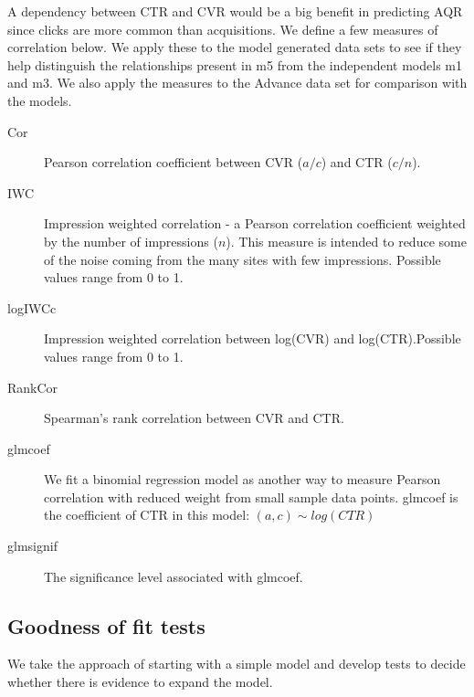 \documentclass[11pt,a4,singlespacing,titlepagenumber=on]{scrreprt}
\numberwithin{equation}{chapter} %
\theoremstyle{remark}
\begin{document}
A dependency between CTR and CVR would be a big benefit in predicting AQR since clicks are more common than acquisitions. We define a few measures of correlation below. We apply these to the model generated data sets to see if they help distinguish the relationships present in m5 from the independent models m1 and m3. We also apply the measures to the Advance data set for comparison with the models.

\begin{description}
	\item[Cor] Pearson correlation coefficient between CVR ($a/c$) and CTR ($c/n$).
	\item[IWC] Impression weighted correlation - a Pearson correlation coefficient weighted by the number of impressions ($n$). This measure is intended to reduce some of the noise coming from the many sites with few impressions. Possible values range from 0 to 1.
	\item[logIWCc] Impression weighted correlation between log(CVR) and log(CTR).Possible values range from 0 to 1.
	\item[RankCor] Spearman's rank correlation between CVR and CTR.
	\item[glmcoef] We fit a binomial regression model as another way to measure Pearson correlation with reduced weight from small sample data points. glmcoef is the coefficient of CTR in this model:
	$(a,c) \sim log(CTR)$ 
	\item[glmsignif] The significance level associated with glmcoef.
\end{description}


\subsection{Goodness of fit tests}

We take the approach of starting with a simple model and develop tests to decide whether there is evidence to expand the model. 
\end{document}
